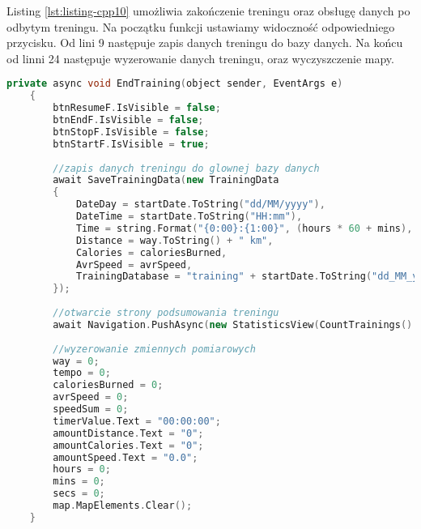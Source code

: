 Listing \ref{lst:listing-cpp10} umożliwia zakończenie treningu oraz obsługę danych po odbytym treningu. Na początku funkcji ustawiamy widoczność odpowiedniego przycisku. Od lini 9 następuje zapis danych treningu do bazy danych. Na końcu od linni 24 następuje wyzerowanie danych treningu, oraz wyczyszczenie mapy.
\begin{lstlisting}[caption=Zakończenie treningu\, zapis danych do bazy i ich podsumowanie, label={lst:listing-cpp10}, language=C++]
	private async void EndTraining(object sender, EventArgs e)
	{
		btnResumeF.IsVisible = false;
		btnEndF.IsVisible = false;
		btnStopF.IsVisible = false;
		btnStartF.IsVisible = true;
		
		//zapis danych treningu do glownej bazy danych
		await SaveTrainingData(new TrainingData
		{
			DateDay = startDate.ToString("dd/MM/yyyy"),
			DateTime = startDate.ToString("HH:mm"),
			Time = string.Format("{0:00}:{1:00}", (hours * 60 + mins), secs),
			Distance = way.ToString() + " km",
			Calories = caloriesBurned,
			AvrSpeed = avrSpeed, 
			TrainingDatabase = "training" + startDate.ToString("dd_MM_yyyy_HH_mm_ss") + ".db3"
		});
		
		//otwarcie strony podsumowania treningu
		await Navigation.PushAsync(new StatisticsView(CountTrainings().Result.ToString()));
		
		//wyzerowanie zmiennych pomiarowych
		way = 0;
		tempo = 0;
		caloriesBurned = 0;
		avrSpeed = 0;
		speedSum = 0;
		timerValue.Text = "00:00:00";
		amountDistance.Text = "0";
		amountCalories.Text = "0";
		amountSpeed.Text = "0.0";
		hours = 0;
		mins = 0;
		secs = 0;
		map.MapElements.Clear();
	}
\end{lstlisting}

